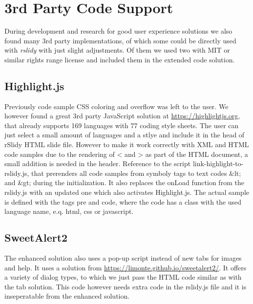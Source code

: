 %
%
% 
% 
% 


\chapter{3rd Party Code Support}

\label{chap:3rdParty}

During development and research for good user experience solutions we also found many 3rd party implementations, of which some could be directly used with \textit{rslidy} with just slight adjustments. Of them we used two with MIT or similar rights range license and included them in the extended code solution.

\section{Highlight.js}

Previously code sample CSS coloring and overflow was left to the user. We however found a great 3rd party JavaScript solution at \url{
https://highlightjs.org}, that already supports 169 languages with 77 coding style sheets. The user can just select a small amount of languages and a stlye and include it in the head of rSlidy HTML slide file. However to make it work correctly with XML and HTML code samples due to the rendering of < and > as part of the HTML document, a small addition is needed in the header. Reference to the script link-highlight-to-rslidy.js, that prerenders all code samples from symboly tags to text codes \&lt; and \&gt; during the initialization. It also replaces the onLoad function from the rslidy.js with an updated one which also activates Highlight.js. The actual sample is defined with the tags pre and code, where the code has a class with the used language name, e.q. html, css or javascript.

\section{SweetAlert2}

The enhanced solution also uses a pop-up script instead of new tabs for images and help. It uses a solution from \url{https://limonte.github.io/sweetalert2/}. It offers a variety of dialog types, to which we just pass the HTML code similar as with the tab solution. This code however needs extra code in the rslidy.js file and it is inseperatable from the enhanced solution.